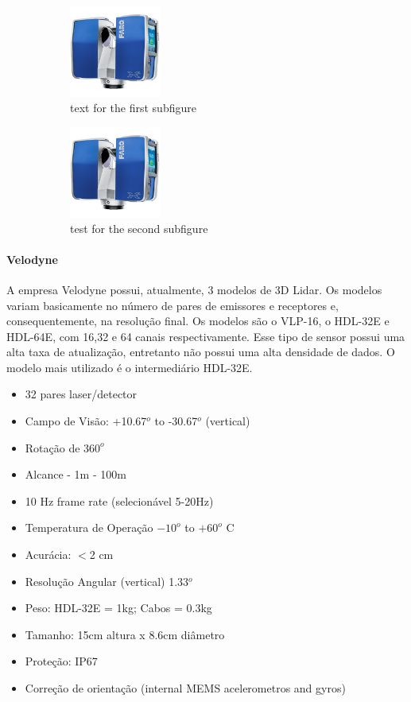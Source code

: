 \begin{figure}
\begin{subfigure}{0.49\columnwidth}
\includegraphics[height=3cm,width=\columnwidth]{figs/3dsensors/faro}
\caption{text for the first subfigure}
\label{sfig:testa}
\end{subfigure}\hfill
\begin{subfigure}{0.49\columnwidth}
\includegraphics[height=3cm,width=\columnwidth]{figs/3dsensors/faro}
\caption{test for the second subfigure}
\label{sfig:testb}
\end{subfigure}\hfill
\caption{}
\label{}
\end{figure}


\paragraph{Velodyne}

A empresa Velodyne possui, atualmente, 3 modelos de 3D Lidar. Os modelos variam
basicamente no número de pares de emissores e receptores e, consequentemente, na
resolução final. Os modelos são o VLP-16, o HDL-32E e HDL-64E, com 16,32 e 64
canais respectivamente. Esse tipo de sensor possui uma alta taxa de
atualização, entretanto não possui uma alta densidade de dados. O modelo mais
utilizado é o intermediário HDL-32E.

\begin{itemize}
\item 32 pares laser/detector  
\item Campo de Visão: +10.67$^o$ to -30.67$^o$ (vertical)
\item Rotação de $360^o$
\item Alcance - 1m - 100m 
\item 10 Hz frame rate (selecionável 5-20Hz)
\item Temperatura de Operação $-10^o$ to $+60^o$ C
\item Acurácia: $<$2 cm
\item Resolução Angular (vertical) 1.33$^o$
\item Peso: HDL-32E = 1kg; Cabos = 0.3kg
\item Tamanho: 15cm altura x 8.6cm diâmetro
\item Proteção: IP67
\item Correção de orientação (internal MEMS acelerometros and gyros)
\end{itemize}

